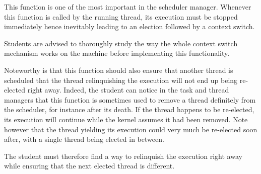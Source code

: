          {
           This function is one of the most important in the scheduler
           manager. Whenever this function is called by the running thread,
           its execution must be stopped immediately hence inevitably
           leading to an election followed by a context switch.

           \-

           Students are advised to thoroughly study the way the whole
           context switch mechanism works on the 
           machine before implementing this functionality.

           \-

           Noteworthy is that this function should also ensure that another
           thread is scheduled \ie{} that the thread relinquishing the
           execution will not end up being re-elected right away. Indeed,
           the student can notice in the task and thread managers that this
           function is sometimes used to remove a thread definitely from
           the scheduler, for instance after its death. If the thread happens
           to be re-elected, its execution will continue while the kernel
           assumes it had been removed. Note however that the thread yielding
           its execution could very much be re-elected soon after, with a
           single thread being elected in between.

           \-

           The student must therefore find a way to relinquish the execution
           right away while ensuring that the next elected thread is different.
         }

